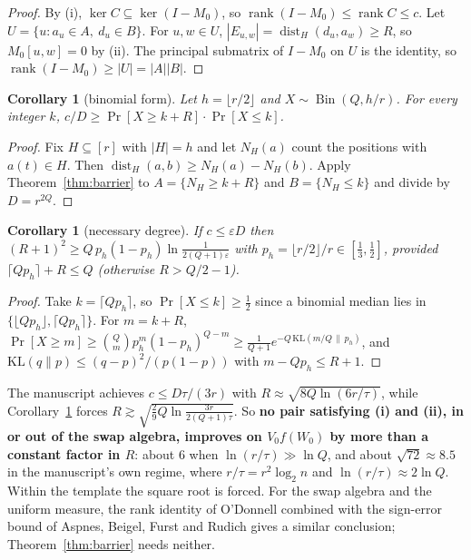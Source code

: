 \documentclass[11pt]{article}
\newtheorem{corollary}[theorem]{Corollary}
\theoremstyle{definition}
\theoremstyle{remark}
\newcommand{\rank}{\operatorname{rank}}
\newcommand{\dist}{\operatorname{dist}}
\newcommand{\Bin}{\operatorname{Bin}}
\begin{document}
\begin{proof}
By (i), $\ker C\subseteq\ker(I-M_0)$, so $\rank(I-M_0)\le\rank C\le c$. Let $U=\{u:a_u\in A,\ d_u\in B\}$. For $u,w\in U$, $|E_{u,w}|=\dist_H(d_u,a_w)\ge R$, so $M_0[u,w]=0$ by (ii). The principal submatrix of $I-M_0$ on $U$ is the identity, so $\rank(I-M_0)\ge|U|=|A||B|$.
\end{proof}

\begin{corollary}[binomial form]\label{cor:binomial}
Let $h=\lfloor r/2\rfloor$ and $X\sim\Bin(Q,h/r)$. For every integer $k$, $c/D\ge\Pr[X\ge k+R]\cdot\Pr[X\le k]$.
\end{corollary}

\begin{proof}
Fix $H\subseteq[r]$ with $|H|=h$ and let $N_H(a)$ count the positions with $a(t)\in H$. Then $\dist_H(a,b)\ge N_H(a)-N_H(b)$. Apply Theorem~\ref{thm:barrier} to $A=\{N_H\ge k+R\}$ and $B=\{N_H\le k\}$ and divide by $D=r^{2Q}$.
\end{proof}

\begin{corollary}[necessary degree]\label{cor:degree}
If $c\le\varepsilon D$ then $(R+1)^2\ge Q\,p_h(1-p_h)\ln\frac1{2(Q+1)\varepsilon}$ with $p_h=\lfloor r/2\rfloor/r\in[\frac13,\frac12]$, provided $\lceil Qp_h\rceil+R\le Q$ (otherwise $R>Q/2-1$).
\end{corollary}

\begin{proof}
Take $k=\lceil Qp_h\rceil$, so $\Pr[X\le k]\ge\frac12$ since a binomial median lies in $\{\lfloor Qp_h\rfloor,\lceil Qp_h\rceil\}$. For $m=k+R$, $\Pr[X\ge m]\ge\binom Qm p_h^m(1-p_h)^{Q-m}\ge\frac1{Q+1}e^{-Q\,\mathrm{KL}(m/Q\,\|\,p_h)}$, and $\mathrm{KL}(q\|p)\le(q-p)^2/(p(1-p))$ with $m-Qp_h\le R+1$.
\end{proof}

The manuscript achieves $c\le D\tau/(3r)$ with $R\approx\sqrt{8Q\ln(6r/\tau)}$, while Corollary~\ref{cor:degree} forces $R\gtrsim\sqrt{\frac29Q\ln\frac{3r}{2(Q+1)\tau}}$. So \textbf{no pair satisfying (i) and (ii), in or out of the swap algebra, improves on $V_0f(W_0)$ by more than a constant factor in $R$}: about $6$ when $\ln(r/\tau)\gg\ln Q$, and about $\sqrt{72}\approx8.5$ in the manuscript's own regime, where $r/\tau=r^2\log_2n$ and $\ln(r/\tau)\approx2\ln Q$. Within the template the square root is forced. For the swap algebra and the uniform measure, the rank identity of O'Donnell \cite[Lemma~4.1]{odonnell} combined with the sign-error bound of Aspnes, Beigel, Furst and Rudich \cite{abfr} gives a similar conclusion; Theorem~\ref{thm:barrier} needs neither.
\end{document}
